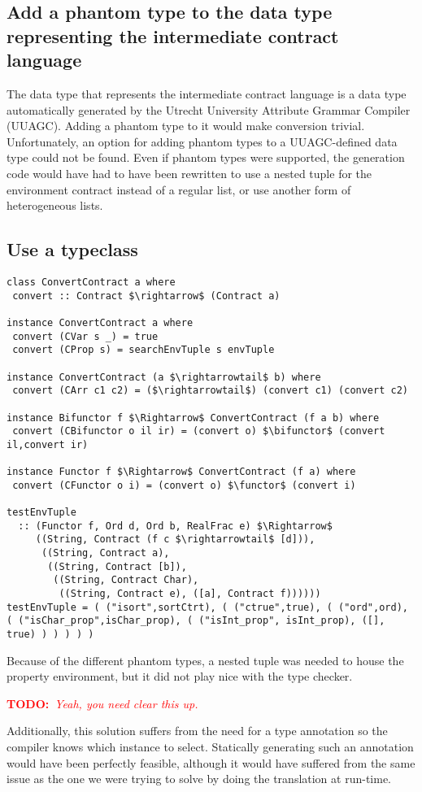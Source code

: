 \documentclass[10pt]{report}
\makeatletter
\newcommand{\functor}{<\!\!\!@\!\!\!>}
\newcommand{\bifunctor}{<\!\!\!@\!\!@\!\!\!>}
\newcommand{\annotate}[3]{
	\begin{scriptsize}
	\textcolor{#1}{\textbf{#2}~\textit{#3}}
	\end{scriptsize}\newline}
\newcommand{\todo}[1]{\annotate{red} {TODO:} {#1}}
\makeatother
\begin{document}
{\subsection{Add a phantom type to the data type representing the intermediate contract language}
The data type that represents the intermediate contract language is a data type automatically generated by the Utrecht University Attribute Grammar Compiler (UUAGC). 
Adding a phantom type to it would make conversion trivial.
Unfortunately, an option for adding phantom types to a UUAGC-defined data type could not be found.
Even if phantom types were supported, the generation code would have had to have been rewritten to use a nested tuple for the environment contract instead of a regular list, or use another form of heterogeneous lists.

\subsection{Use a typeclass}

\begin{lstlisting}[caption=Attempt at using a typeclass to recover the extra type information.,mathescape]
class ConvertContract a where
 convert :: Contract $\rightarrow$ (Contract a)

instance ConvertContract a where
 convert (CVar s _) = true
 convert (CProp s) = searchEnvTuple s envTuple

instance ConvertContract (a $\rightarrowtail$ b) where
 convert (CArr c1 c2) = ($\rightarrowtail$) (convert c1) (convert c2)

instance Bifunctor f $\Rightarrow$ ConvertContract (f a b) where
 convert (CBifunctor o il ir) = (convert o) $\bifunctor$ (convert il,convert ir)

instance Functor f $\Rightarrow$ ConvertContract (f a) where
 convert (CFunctor o i) = (convert o) $\functor$ (convert i)
 
testEnvTuple
  :: (Functor f, Ord d, Ord b, RealFrac e) $\Rightarrow$
     ((String, Contract (f c $\rightarrowtail$ [d])),
      ((String, Contract a),
       ((String, Contract [b]),
        ((String, Contract Char),
         ((String, Contract e), ([a], Contract f))))))
testEnvTuple = ( ("isort",sortCtrt), ( ("ctrue",true), ( ("ord",ord), ( ("isChar_prop",isChar_prop), ( ("isInt_prop", isInt_prop), ([], true) ) ) ) ) )
\end{lstlisting}

Because of the different phantom types, a nested tuple was needed to house the property environment, but it did not play nice with the type checker. \todo{Yeah, you need clear this up.}
Additionally, this solution suffers from the need for a type annotation so the compiler knows which instance to select.
Statically generating such an annotation would have been perfectly feasible, although it would have suffered from the same issue as the one we were trying to solve by doing the translation at run-time.

}
\end{document}
